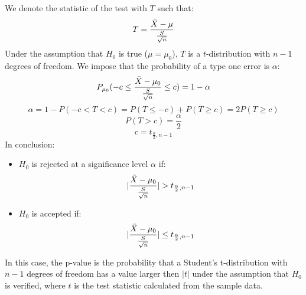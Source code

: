
We denote the statistic of the test with $T$ such that:
\[
	T = \frac{\Bar{X}-\mu}{\frac{S}{\sqrt{n}}}
\]
Under the assumption that $H_{0}$ is true ($\mu = \mu_{0}$), $T$ is a $t$-distribution
with $n-1$ degrees of freedom. We impose that the probability of a type one
error is $\alpha$:
\[
	P_{\mu_0}(-c \leq \frac{\Bar{X}-\mu_{0}}{\frac{S}{\sqrt{n}}}\leq c) = 1 - \alpha
\]
\[
	\alpha = 1 - P(-c < T < c) = P(T \leq -c) + P(T \geq c) = 2P(T \geq c)
\]
\[
	P(T>c) = \frac{\alpha}{2}
\]
\[
	c = t_{\frac{\alpha}{2},n-1}
\]
In conclusion:
\begin{itemize}
	\item $H_{0}$ is rejected at a significance level $\alpha$ if:
		\[
			|\frac{\Bar{X}-\mu_{0}}{\frac{S}{\sqrt{n}}}|>t_{\frac{\alpha}{2},n-1}
		\]

	\item $H_{0}$ is accepted if:
		\[
			|\frac{\Bar{X}-\mu_{0}}{\frac{S}{\sqrt{n}}}|\leq t_{\frac{\alpha}{2},n-1}
		\]
\end{itemize}

In this case, the p-value is the probability that a Student's t-distribution
with $n-1$ degrees of freedom has a value larger then $|t|$ under the assumption
that $H_{0}$ is verified, where $t$ is the test statistic calculated from the sample
data.

